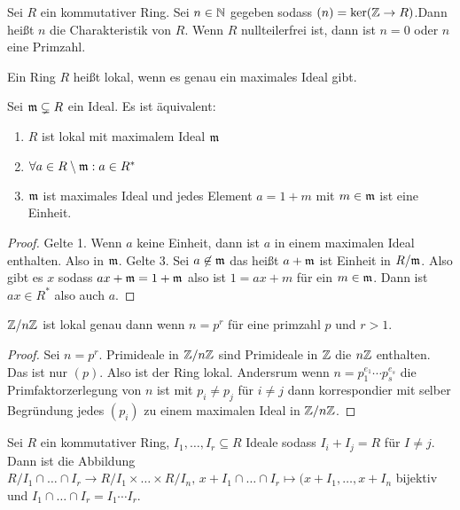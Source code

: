 \begin{Def}
	Sei \(R\) ein kommutativer Ring. Sei \(n\in \mathbb{N}\) gegeben sodass \((n)=\ker(\mathbb{Z}\to R)\).Dann heißt \(n\) die Charakteristik von \(R\). Wenn \(R\) nullteilerfrei ist, dann ist \(n=0\) oder \(n\) eine Primzahl.
\end{Def}\begin{Def}
	Ein Ring \(R\) heißt lokal, wenn es genau ein maximales Ideal gibt.
\end{Def}
\begin{Satz}
	Sei \(\mathfrak{m}\subsetneq R\) ein Ideal. Es ist äquivalent:
	\begin{enumerate}
		\item \(R\) ist lokal mit maximalem Ideal \(\mathfrak{m}\)
		\item \(\forall a\in R\setminus \mathfrak{m}: a\in R^*\)
		\item \(\mathfrak{m}\) ist maximales Ideal und jedes Element \(a=1+m\) mit \(m\in\mathfrak{m}\) ist eine Einheit.
	\end{enumerate}
\end{Satz}
\begin{proof}
	Gelte 1. Wenn \(a\) keine Einheit, dann ist \(a\) in einem maximalen Ideal enthalten. Also in \(\mathfrak{m}\).
	Gelte 3. Sei \(a\not \in\mathfrak{m}\) das heißt \(a+\mathfrak{m}\) ist Einheit in \(R/\mathfrak{m}\). Also gibt es \(x\) sodass \(ax+\mathfrak{m}=1+\mathfrak{m}\) also ist \(1=ax+m\) für ein \(m\in\mathfrak{m}\). Dann ist \(ax\in R^*\) also auch \(a\).
\end{proof}
\begin{Lemma}
	\(\mathbb{Z}/n\mathbb{Z}\) ist lokal genau dann wenn \(n=p^r\) für eine primzahl \(p\) und \(r>1\).
\end{Lemma}
\begin{proof}
	Sei \(n=p^r\). Primideale in \(\mathbb{Z}/n\mathbb{Z}\) sind Primideale in \(\mathbb{Z}\) die \(n\mathbb{Z}\) enthalten. Das ist nur \((p)\). Also ist der Ring lokal.
	Andersrum wenn \(n=p_1^{e_1}\cdots p_s^{e_s}\) die Primfaktorzerlegung von \(n\) ist mit \(p_i\neq p_j\) für \(i\neq j\) dann korrespondier mit selber Begründung jedes \((p_i)\) zu einem maximalen Ideal in \(\mathbb{Z}/n\mathbb{Z}\).
\end{proof}
\begin{Satz} 
	Sei \(R\) ein kommutativer Ring, \(I_1,\dots,I_r\subseteq R\) Ideale sodass \(I_i+I_j=R\) für \(I\neq j\).
	Dann ist die Abbildung \(R/I_1\cap\dots\cap I_r\to R/I_1\times\dots\times R/I_n,\, x+I_1\cap\dots\cap I_r\mapsto (x+I_1,\dots,x+I_n\) bijektiv und \(I_1\cap\dots\cap I_r=I_1\cdots I_r\).
\end{Satz}
